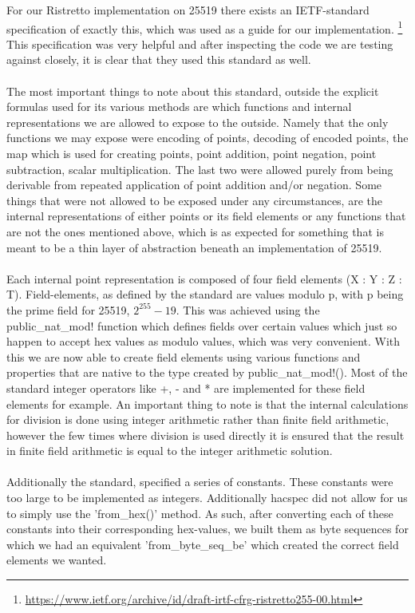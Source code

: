 \documentclass{article}
\begin{document}
For our Ristretto implementation on 25519 there exists an IETF-standard specification of exactly this, which was used as a guide for our implementation. \footnote{\url{https://www.ietf.org/archive/id/draft-irtf-cfrg-ristretto255-00.html}} This specification was very helpful and after inspecting the code we are testing against closely, it is clear that they used this standard as well. 
\\\\
The most important things to note about this standard, outside the explicit formulas used for its various methods are which functions and internal representations we are allowed to expose to the outside. Namely that the only functions we may expose were encoding of points, decoding of encoded points, the map which is used for creating points, point addition, point negation, point subtraction, scalar multiplication. The last two were allowed purely from being derivable from repeated application of point addition and/or negation. Some things that were not allowed to be exposed under any circumstances, are the internal representations of either points or its field elements or any functions that are not the ones mentioned above, which is as expected for something that is meant to be a thin layer of abstraction beneath an implementation of 25519.
\\\\
Each internal point representation is composed of four field elements (X : Y : Z : T). Field-elements, as defined by the standard are values modulo p, with p being the prime field for 25519, $2^{255} - 19$. This was achieved using the public\_nat\_mod! function which defines fields over certain values which just so happen to accept hex values as modulo values, which was very convenient. With this we are now able to create field elements using various functions and properties that are native to the type created by public\_nat\_mod!(). Most of the standard integer operators like +, - and * are implemented for these field elements for example. An important thing to note is that the internal calculations for division is done using integer arithmetic rather than finite field arithmetic, however the few times where division is used directly it is ensured that the result in finite field arithmetic is equal to the integer arithmetic solution. 
\\\\
Additionally the standard, specified a series of constants. These constants were too large to be implemented as integers. Additionally hacspec did not allow for us to simply use the 'from\_hex()' method. As such, after converting each of these constants into their corresponding hex-values, we built them as byte sequences for which we had an equivalent 'from\_byte\_seq\_be' which created the correct field elements we wanted. 
\end{document}

